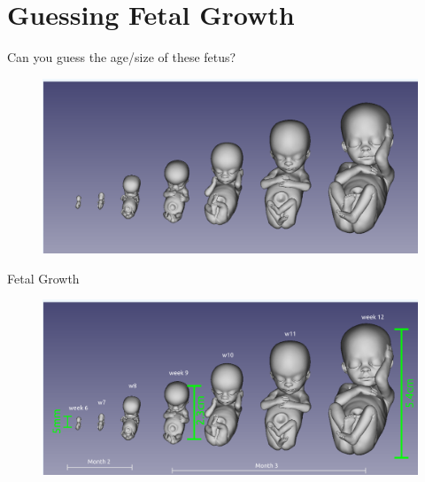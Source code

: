 \section{Guessing Fetal Growth}


{
\begin{frame}{Can you guess the age/size of these fetus?}
      \begin{figure}
        \centering
        \includegraphics[width=1.0\textwidth]{./figures/fetal-ages/versions/drawing-v00.png}
      \end{figure}
\end{frame}
}

{
\begin{frame}{Fetal Growth}
      \begin{figure}
        \centering
        \includegraphics[width=1.0\textwidth]{./figures/fetal-ages/versions/drawing-v01.png}
      \end{figure}
\end{frame}
}
